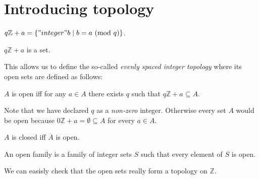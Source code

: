 \documentclass{article}
\renewcommand{\mod}{\text{mod }}
\newcommand{\Int}{\mathbb{Z}}
\begin{document}
  \section{Introducing topology}

  \begin{forthel}
    \begin{definition}[ArSeq]
      $q \Int + a = \{ "integer" b \mid b = a ~(\mod q) \}$.
    \end{definition}

    \begin{lemma}
      $q \Int + a$ is a set.
    \end{lemma}
  \end{forthel}

  This allows us to define the so-called \textit{evenly spaced integer topology} where its open sets are defined as follows:

  \begin{forthel}
    \begin{definition}[Open]
      $A$ is open iff for any $a \in A$ there exists $q$ such that $q \Int + a \subseteq A$.
    \end{definition}
  \end{forthel}

  Note that we have declared $q$ as a \textit{non-zero} integer. Otherwise every set $A$ would be open because $0 \Int + a = \emptyset \subseteq A$ for every $a \in A$.

  \begin{forthel}
    \begin{definition}[Closed]
      $A$ is closed iff $\overline{A}$ is open.
    \end{definition}

    \begin{definition}[OpenIntegerSets]
      An open family is a family of integer sets $S$ such that every element of $S$ is open.
    \end{definition}
  \end{forthel}

  We can easisly check that the open sets really form a topology on $\Int$.
\end{document}
